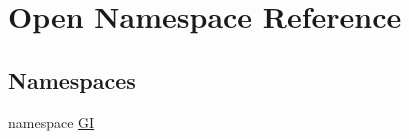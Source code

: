 \hypertarget{namespace_open}{}\section{Open Namespace Reference}
\label{namespace_open}
\subsection*{Namespaces}
\begin{DoxyCompactItemize}
\item 
namespace \hyperlink{namespace_open_1_1_g_i}{GI}
\end{DoxyCompactItemize}
